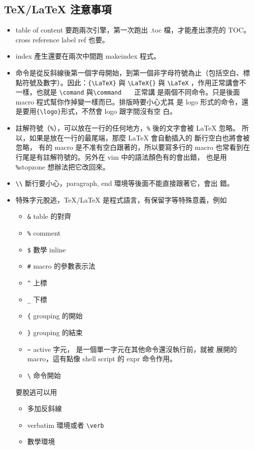  \subsection{\TeX{}/\LaTeX{} 注意事項}
  \begin{itemize}
    \item table of content 要跑兩次引擎，第一次跑出 .toc 檔，才能產出漂亮的
      TOC。 cross reference label ref 也要。
    \item index 產生還要在兩次中間跑 makeindex 程式。
    \item 命令是從反斜線後第一個字母開始，到第一個非字母符號為止（包括空白、標
      點符號及數字）。因此：\verb={\LaTeX}= 與 \verb=\LaTeX{}= 與 \verb=\LaTeX=
      ，作用正常講會不一樣，也就是 \verb=\comand= 與\verb=\command   = 正常講
      是兩個不同命令。只是後面 macro 程式幫你作掉變一樣而已。排版時要小心尤其
      是 logo 形式的命令，還是要用\verb={\logo}=形式，不然會 logo 跟字間沒有空
      白。
    \item 註解符號（\verb=%=），可以放在一行的任何地方，\verb=%= 後的文字會被
      {\LaTeX} 忽略。 所以，如果是放在一行的最尾端，那麼 {\LaTeX} 會自動插入的
      斷行空白也將會被忽略， 有的 macro 是不准有空白跟著的，所以要寫多行的
      macro 也常看到在行尾是有註解符號的。另外在 vim 中的語法顏色有的會出錯，
      也是用 \verb=%=stopzone 想辦法把它改回來。
    \item \verb=\\= 斷行要小心，paragraph, end 環境等後面不能直接跟著它，會出
      錯。
    \item 特殊字元脫逃，\TeX{}/\LaTeX{} 是程式語言，有保留字等特殊意義，例如
      \begin{itemize}
        \item \verb=&= table 的對齊
        \item \verb=%= comment
        \item \verb=$= 數學 inline
        \item \verb=#= macro 的參數表示法
        \item \verb=^= 上標
        \item \verb=_= 下標
        \item \verb={= grouping 的開始
        \item \verb=}= grouping 的結束
        \item \verb=~= active 字元， 是一個單一字元在其他命令還沒執行前，就被
          展開的 macro，這有點像 shell script 的 expr 命令作用。
        \item \verb=\= 命令開始
      \end{itemize}
      要脫逃可以用
      \begin{itemize}
        \item 多加反斜線
        \item verbatim 環境或者 \verb=\verb=
        \item 數學環境
      \end{itemize}
  \end{itemize}
